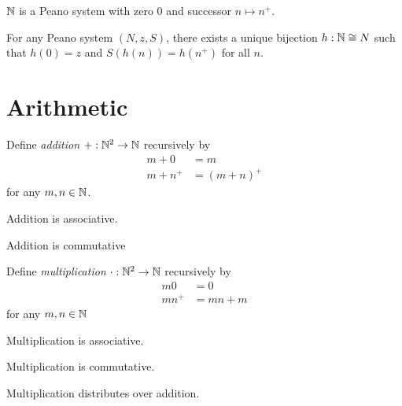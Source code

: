 \begin{theorem}
    $\mathbb{N}$ is a Peano system with zero $0$ and successor $n \mapsto n^+$.
\end{theorem}

\begin{theorem}
    For any Peano system $(N, z, S)$, there exists a unique bijection
    $h : \mathbb{N} \cong N$ such that $h(0) = z$ and $S(h(n)) = h(n^+)$
    for all $n$.
\end{theorem}

\section{Arithmetic}

\begin{definition}[Addition]
    Define \emph{addition} $+ : \mathbb{N}^2 \rightarrow \mathbb{N}$ recursively by
    \begin{align*}
        m + 0 & = m \\
        m + n^+ & = (m + n)^+
    \end{align*}
    for any $m, n \in \mathbb{N}$.
\end{definition}

\begin{theorem}
    Addition is associative.
\end{theorem}

\begin{theorem}
    Addition is commutative
\end{theorem}

\begin{definition}[Multiplication]
    Define \emph{multiplication} $\cdot : \mathbb{N}^2 \rightarrow \mathbb{N}$ recursively by
    \begin{align*}
        m 0 & = 0 \\
        m n^+ & = mn + m
    \end{align*}
    for any $m, n \in \mathbb{N}$
\end{definition}

\begin{theorem}
    Multiplication is associative.
\end{theorem}

\begin{theorem}
    Multiplication is commutative.
\end{theorem}

\begin{theorem}
    Multiplication distributes over addition.
\end{theorem}

